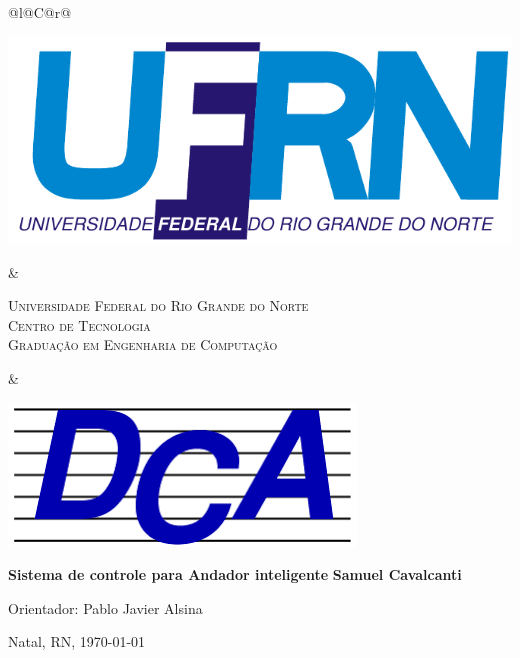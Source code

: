 %
%

\begin{titlepage}

\begin{center}

\small

\begin{tabularx}{\linewidth}{@{}l@{}C@{}r@{}}
\parbox[c]{3cm}{\includegraphics[width=\linewidth]{./figuras/UFRN}} &
\begin{center}
\textsf{\textsc{Universidade Federal do Rio Grande do Norte\\
Centro de Tecnologia\\
Graduação em Engenharia de Computação}}
\end{center} &
\parbox[c]{3cm}{\includegraphics[width=\linewidth]{./figuras/dca_logo.png}}
\end{tabularx}

\vfill
\LARGE
\textbf{Sistema de controle para Andador inteligente}
\vfill
\Large
\textbf{Samuel Cavalcanti}
\vfill

\normalsize

Orientador: Pablo Javier Alsina

\vfill

\hfill


\vfill

\large

Natal, RN, \today

\end{center}

\end{titlepage}